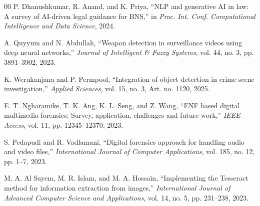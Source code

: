 \documentclass[conference]{IEEEtran}
\begin{document}
\begin{thebibliography}{00}
 P. Dhanushkumar, R. Anand, and K. Priya, ``NLP and generative AI in law: A survey of AI-driven legal guidance for BNS,'' in \textit{Proc. Int. Conf. Computational Intelligence and Data Science}, 2024.

 A. Quyyum and N. Abdullah, ``Weapon detection in surveillance videos using deep neural networks,'' \textit{Journal of Intelligent \& Fuzzy Systems}, vol. 44, no. 3, pp. 3891--3902, 2023.

 K. Werukanjana and P. Permpool, ``Integration of object detection in crime scene investigation,'' \textit{Applied Sciences}, vol. 15, no. 3, Art. no. 1120, 2025.

 E. T. Ngharamike, T. K. Ang, K. L. Seng, and Z. Wang, ``ENF based digital multimedia forensics: Survey, application, challenges and future work,'' \textit{IEEE Access}, vol. 11, pp. 12345--12370, 2023.

 S. Pedapudi and R. Vadlamani, ``Digital forensics approach for handling audio and video files,'' \textit{International Journal of Computer Applications}, vol. 185, no. 12, pp. 1--7, 2023.

 M. A. Al Sayem, M. R. Islam, and M. A. Hossain, ``Implementing the Tesseract method for information extraction from images,'' \textit{International Journal of Advanced Computer Science and Applications}, vol. 14, no. 5, pp. 231--238, 2023.

\end{thebibliography}
\end{document}
